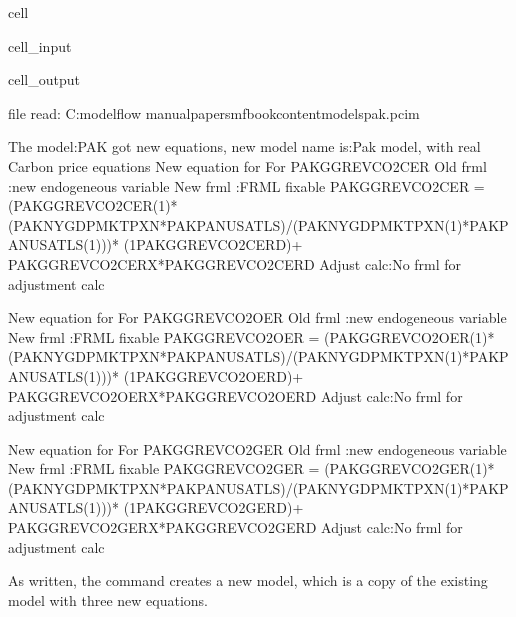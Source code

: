 \documentclass[letterpaper,10pt,english]{jupyterBook}
\begin{document}
\begin{sphinxuseclass}{cell}
\begin{sphinxVerbatimInput}
\begin{sphinxuseclass}{cell_input}
\end{sphinxuseclass}\end{sphinxVerbatimInput}
\begin{sphinxVerbatimOutput}

\begin{sphinxuseclass}{cell_output}
\begin{sphinxVerbatim}[commandchars=\\\{\}]
file read:  C:\PYGZbs{}modelflow manual\PYGZbs{}papers\PYGZbs{}mfbook\PYGZbs{}content\PYGZbs{}models\PYGZbs{}pak.pcim
\end{sphinxVerbatim}

\begin{sphinxVerbatim}[commandchars=\\\{\}]
The model:\PYGZdq{}PAK\PYGZdq{} got new equations, new model name is:\PYGZdq{}Pak model, with real Carbon price equations\PYGZdq{}
New equation for For PAKGGREVCO2CER
Old frml   :new endogeneous variable 
New frml   :FRML \PYGZlt{}fixable\PYGZgt{} PAKGGREVCO2CER = (PAKGGREVCO2CER(\PYGZhy{}1)*(PAKNYGDPMKTPXN*PAKPANUSATLS)/(PAKNYGDPMKTPXN(\PYGZhy{}1)*PAKPANUSATLS(\PYGZhy{}1)))* (1\PYGZhy{}PAKGGREVCO2CER\PYGZus{}D)+ PAKGGREVCO2CER\PYGZus{}X*PAKGGREVCO2CER\PYGZus{}D\PYGZdl{}
Adjust calc:No frml for adjustment calc  

New equation for For PAKGGREVCO2OER
Old frml   :new endogeneous variable 
New frml   :FRML \PYGZlt{}fixable\PYGZgt{} PAKGGREVCO2OER = (PAKGGREVCO2OER(\PYGZhy{}1)*(PAKNYGDPMKTPXN*PAKPANUSATLS)/(PAKNYGDPMKTPXN(\PYGZhy{}1)*PAKPANUSATLS(\PYGZhy{}1)))* (1\PYGZhy{}PAKGGREVCO2OER\PYGZus{}D)+ PAKGGREVCO2OER\PYGZus{}X*PAKGGREVCO2OER\PYGZus{}D\PYGZdl{}
Adjust calc:No frml for adjustment calc  

New equation for For PAKGGREVCO2GER
Old frml   :new endogeneous variable 
New frml   :FRML \PYGZlt{}fixable\PYGZgt{} PAKGGREVCO2GER = (PAKGGREVCO2GER(\PYGZhy{}1)*(PAKNYGDPMKTPXN*PAKPANUSATLS)/(PAKNYGDPMKTPXN(\PYGZhy{}1)*PAKPANUSATLS(\PYGZhy{}1)))* (1\PYGZhy{}PAKGGREVCO2GER\PYGZus{}D)+ PAKGGREVCO2GER\PYGZus{}X*PAKGGREVCO2GER\PYGZus{}D\PYGZdl{}
Adjust calc:No frml for adjustment calc  
\end{sphinxVerbatim}

\end{sphinxuseclass}\end{sphinxVerbatimOutput}

\end{sphinxuseclass}
\sphinxAtStartPar
As written, the  command creates a new model, which is a copy of the existing model with three new equations.
\end{document}
